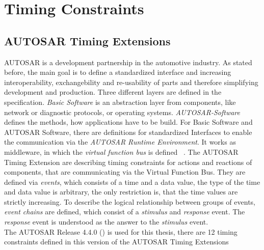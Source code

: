 
\chapter{Timing Constraints}
\label{chapter-TimingConstraints}

\section{AUTOSAR Timing Extensions}
	AUTOSAR is a development partnership in the automotive industry. As stated before, the main goal is to define a standardized interface and increasing interoperability, exchangebility and re-usability of parts and therefore simplifying development and production. Three different layers are defined in the specification. \emph{Basic Software} is an abstraction layer from components, like network or diagnostic protocols, or operating systems. \emph{AUTOSAR-Software} defines the methods, how applications have to be build. For Basic Software and AUTOSAR Software, there are definitions for standardized Interfaces to enable the communication via the \emph{AUTOSAR Runtime Environment}. It works as middleware, in which the \emph{virtual function bus} is defined ~\cite{Virtual_Functional_Bus}.
	The AUTOSAR Timing Extension are describing timing constraints for actions and reactions of components, that are communicating via the Virtual Function Bus. They are defined via \emph{events}, which consists of a time and a data value, the type of the time and data value is arbitrary, the only restriction is, that the time values are strictly increasing. To describe the logical relationship between groups of events, \emph{event chains} are defined, which consist of a \emph{stimulus} and \emph{response} event. The \emph{response} event is understood as the answer to the \emph{stimulus} event.\\
	The AUTOSAR Release 4.4.0 (\cite{TIMEX}) is used for this thesis, there are 12 timing constraints defined in this version of the AUTOSAR Timing Extensions
